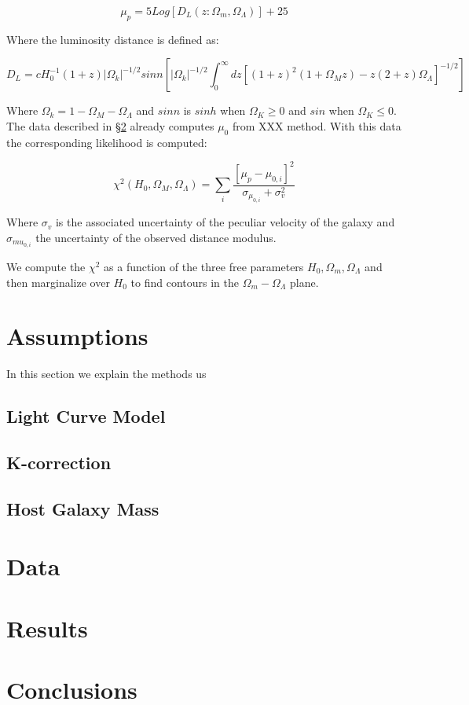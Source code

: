 \documentclass[11pt]{article}
\begin{document}

\begin{equation}\label{eq:dmodulus}
\mu_p =  5Log[D_L(z:\Omega_m, \Omega_{\Lambda})] + 25
\end{equation}

Where the luminosity distance is defined as:

\begin{equation}
D_L = cH_{0}^{-1} (1+z)|\Omega_k|^{-1/2} sin n\left[ |\Omega_k|^{-1/2}
\int_0^{\infty} dz[(1+z)^2(1+\Omega_Mz) - z(2+z)\Omega_{\Lambda}]^{-1/2}\right]
\end{equation}

Where $\Omega_k = 1 - \Omega_M - \Omega_{\Lambda}$ and $sin n$ is
$sinh$ when $\Omega_K \geq 0$ and $sin$ when $\Omega_K \leq 0$. The
data described in \S \ref{sec:data} already computes $\mu_0$ from XXX
method. With this data the corresponding likelihood is computed:

\begin{equation}
\chi^2(H_0, \Omega_M, \Omega_{\Lambda}) = \sum_i
\dfrac{[\mu_p - \mu_{0,i}]^2}{\sigma_{\mu_{0,i}} + \sigma_v^2}
\end{equation}

Where $\sigma_v$ is the associated uncertainty of the peculiar velocity
of the galaxy and $\sigma_{mu_{0,i}}$ the uncertainty of the observed
distance modulus.

We compute the $\chi^2$ as a function of the three free parameters
$H_0, \Omega_m, \Omega_{\Lambda}$ and then marginalize over $H_0$
to find contours in the $\Omega_m - \Omega_{\Lambda}$ plane.

\section{Assumptions}\label{sec:assumptions}

In this section we explain the methods us

\subsection{Light Curve Model}

\subsection{K-correction}

\subsection{Host Galaxy Mass}

\section{Data}\label{sec:data}

\section{Results}\label{sec:results}

\section{Conclusions}\label{sec:conclusions}

\end{document}

